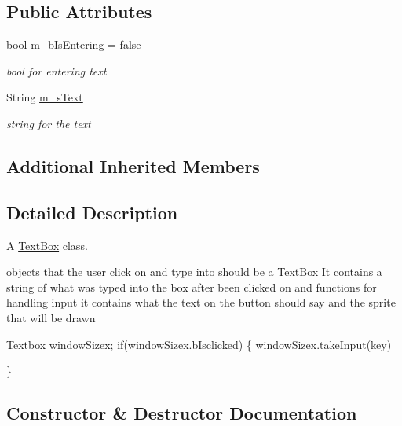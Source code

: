 \subsection*{Public Attributes}
\begin{DoxyCompactItemize}
\item 
\hypertarget{class_text_box_a9bd587d5dda491ff96bb5ef4497eb406}{}\label{class_text_box_a9bd587d5dda491ff96bb5ef4497eb406} 
bool \hyperlink{class_text_box_a9bd587d5dda491ff96bb5ef4497eb406}{m\+\_\+b\+Is\+Entering} = false
\begin{DoxyCompactList}\small\item\em bool for entering text \end{DoxyCompactList}\item 
\hypertarget{class_text_box_a79dde249421f3a5b26f52bbf59f9f2c3}{}\label{class_text_box_a79dde249421f3a5b26f52bbf59f9f2c3} 
String \hyperlink{class_text_box_a79dde249421f3a5b26f52bbf59f9f2c3}{m\+\_\+s\+Text}
\begin{DoxyCompactList}\small\item\em string for the text \end{DoxyCompactList}\end{DoxyCompactItemize}
\subsection*{Additional Inherited Members}


\subsection{Detailed Description}
A \hyperlink{class_text_box}{Text\+Box} class.

objects that the user click on and type into should be a \hyperlink{class_text_box}{Text\+Box} It contains a string of what was typed into the box after been clicked on and functions for handling input it contains what the text on the button should say and the sprite that will be drawn 
\begin{DoxyCode}
Textbox windowSizex;
\textcolor{keywordflow}{if}(windowSizex.bIsclicked)
\{
    windowSizex.takeInput(key)

\}
\end{DoxyCode}
 

\subsection{Constructor \& Destructor Documentation}
\hypertarget{class_text_box_a25b67e5ff6788c60b8aef3f3540879d0}{}\label{class_text_box_a25b67e5ff6788c60b8aef3f3540879d0} 
